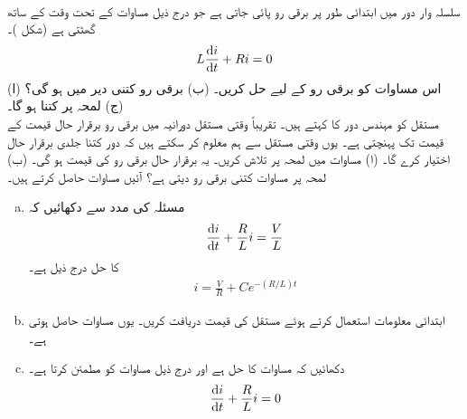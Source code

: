 \\
سلسلہ وار  دور میں ابتدائی طور پر  برقی رو پائی جاتی ہے جو درج ذیل مساوات کے تحت وقت کے ساتھ گھٹتی ہے (شکل )۔
\begin{align*}
L\frac{\dif i}{\dif t}+Ri=0
\end{align*}
(ا) اس مساوات کو برقی رو  کے لیے حل کریں۔ (ب) برقی رو کتنی دیر میں  ہو گی؟ (ج) لمحہ  پر  کتنا ہو گا۔
\\
مستقل  کو مہندس  دور کا  کہتے ہیں۔ تقریباً  وقتی مستقل دورانیہ میں برقی رو برقرار حال قیمت کے  قیمت تک پہنچتی ہے۔ یوں وقتی مستقل سے ہم معلوم کر سکتے ہیں کہ دور کتنا جلدی برقرار  حال   اختیار کرے گا۔ (ا) مساوات  میں لمحہ  پر  تلاش کریں۔ یہ برقرار حال برقی رو کی  قیمت ہو گی۔ (ب) لمحہ  پر  مساوات  کتنی برقی رو دیتی ہے؟
آئیں مساوات  حاصل کرتے ہیں۔ 
\begin{enumerate}[a.]
\item
مسئلہ  کی مدد سے دکھائیں کہ 
\begin{align*}
\frac{\dif i}{\dif t}+\frac{R}{L}i=\frac{V}{L}
\end{align*}
کا حل درج ذیل ہے۔
\begin{align*}
i=\frac{V}{R}+Ce^{-(R/L)t}
\end{align*}
\item
ابتدائی معلومات  استعمال کرتے ہوئے مستقل  کی قیمت دریافت کریں۔ یوں مساوات  حاصل ہوتی ہے۔
\item
دکھائیں کہ  مساوات  کا حل ہے اور   درج ذیل مساوات  کو مطمئن کرتا ہے۔
\begin{align*}
\frac{\dif i}{\dif t}+\frac{R}{L}i=0
\end{align*}
\end{enumerate}
